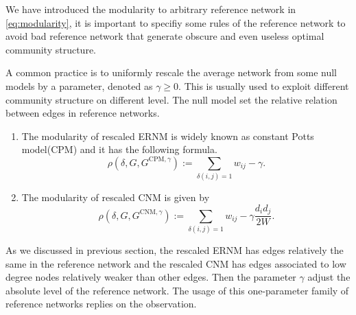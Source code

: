 \documentclass[11pt]{article}
\theoremstyle{definition}
\theoremstyle{definition}
\theoremstyle{definition}
\theoremstyle{remark}
\theoremstyle{plain}
\begin{document}
We have introduced the modularity to arbitrary reference network in \eqref{eq:modularity}, it is important to specifiy some rules of the reference network to avoid bad reference network that generate obscure and even useless optimal community structure. 

A common practice is to uniformly rescale the average network from some null models by a parameter, denoted as $\gamma \geq 0$. This is usually used to exploit different community structure on different level. The null model set the relative relation between edges in reference networks. 

\begin{enumerate}
	\item The modularity of rescaled ERNM is widely known as constant Potts model(CPM) and it has the following formula.
	\begin{equation}\label{eq:modularity-CPM}
		\rho(\delta, G, G^{\text{CPM}, \gamma}) := \sum_{\delta(i, j) = 1} w_{ij} - \gamma.
	\end{equation}
	\item The modularity of rescaled CNM is given by
	\begin{equation}\label{eq:modularity-CNM}
		\rho(\delta, G, G^{\text{CNM}, \gamma}) := \sum_{\delta(i, j) = 1} w_{ij} - \gamma \frac{d_id_j}{2W}.
	\end{equation}
\end{enumerate}

As we discussed in previous section, the rescaled ERNM has edges relatively the same in the reference network and the rescaled CNM has edges associated to low degree nodes relatively weaker than other edges. Then the parameter $\gamma$ adjust the absolute level of the reference network. The usage of this one-parameter family of reference networks replies on the observation.
\end{document}
